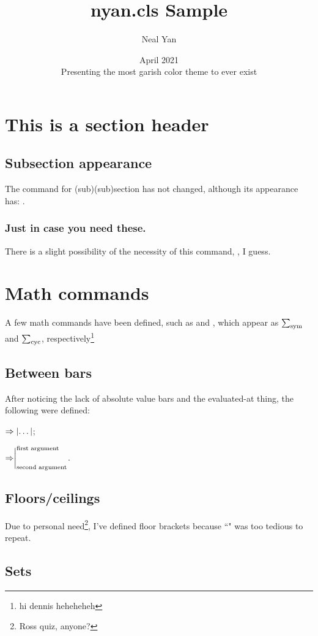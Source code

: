 \documentclass[labelsBySect]{nyan}
\title{nyan.cls Sample}
\author{Neal Yan}
\date{April 2021\\ Presenting the most garish color theme to ever exist}
\begin{document}
\maketitle
\toc
\section{This is a section header}
\subsection{Subsection appearance}
The command for (sub)(sub)section has not changed, although its appearance has: .
\subsubsection{Just in case you need these.}

There is a slight possibility of the necessity of this command, , I guess.

\section{Math commands}

A few math commands have been defined, such as  and , which appear as $\symsum$ and $\cycsum$, respectively\footnote{hi dennis heheheheh}

\subsection{Between bars}

After noticing the lack of absolute value bars and the evaluated-at thing, the following were defined: 

$\Rightarrow\abs{\dots}$;

$\Rightarrow\evalat[\text{first argument}]{\text{second argument}}$.

\subsection{Floors/ceilings}
Due to personal need\footnote{Ross quiz, anyone?}, I've defined floor brackets because ``" was too tedious to repeat. 
\subsection{Sets}
\end{document}
